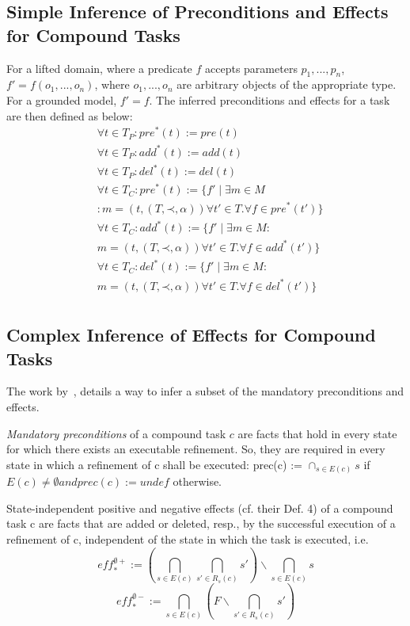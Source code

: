 \documentclass[letterpaper]{article} %
\newcommand{\Pre} {\ensuremath{\mathit{pre}}}  %
\newcommand{\Add} {\ensuremath{\mathit{add}}}
\newcommand{\Del} {\ensuremath{\mathit{del}}}
\newcommand{\PreS} {\ensuremath{\mathit{pre^{*}}}}
\newcommand{\AddS} {\ensuremath{\mathit{add^{*}}}}
\newcommand{\DelS} {\ensuremath{\mathit{del^{*}}}}
\newcommand{\singlePrec} {\ensuremath{\mathit{ \mathord{\prec} }}}
\newcommand{\RelEffPlus} {\ensuremath{\mathit{eff^{\emptyset +}_{*}}}}
\newcommand{\RelEffMinus} {\ensuremath{\mathit{eff^{\emptyset -}_{*}}}}
\begin{document}
 



\subsection{Simple Inference of Preconditions and Effects for Compound Tasks}
For a lifted domain, where a predicate $f$ accepts parameters $p_1, ..., p_n$, 
$f' = f(o_1, ..., o_n)$, where $o_1, ..., o_n$ are arbitrary objects of the appropriate type. For a grounded model, $f' = f$. The inferred preconditions and effects for a task are then defined as below:
\begin{align*}
& \forall t \in T_P : \PreS(t) := \Pre(t) \\
& \forall t \in T_P : \AddS(t) := \Add(t) \\
& \forall t \in T_P : \DelS(t) := \Del(t)  \\ %
& \forall t \in T_C : \PreS(t) := \{f'  \mid  \exists m \in M  \\
& : m=(t,(T, \singlePrec, \alpha)) \forall t' \in T.  \forall  f \in \PreS(t') \}   \\
& \forall t \in T_C : \AddS(t) := \{f'  \mid  \exists m \in M : \\
& m=(t,(T, \singlePrec, \alpha)) \forall t' \in T.  \forall  f \in \AddS(t') \}   \\
& \forall t \in T_C : \DelS(t) := \{f'  \mid  \exists m \in M : \\
& m=(t,(T, \singlePrec, \alpha)) \forall t' \in T.  \forall  f \in \DelS(t') \}   \\ 
\end{align*}


\subsection{Complex Inference of Effects for Compound Tasks}
The work by~\cite{ConnyPreEstimation}, details a way to infer a subset of the mandatory preconditions and effects. 

\emph{Mandatory preconditions} of a compound task $c$ are facts that hold in every state for which there exists an executable refinement. So, they are required in every state in which a refinement of c shall be executed: prec(c) := $\cap_{s \in E(c)}  s$
if $E(c) \neq \emptyset and prec(c) := undef$ otherwise.

State-independent positive and negative effects (cf. their
Def. 4) of a compound task c are facts that are added or
deleted, resp., by the successful execution of a refinement of
c, independent of the state in which the task is executed, i.e.
$$ \RelEffPlus := ( \bigcap_{s \in E(c)} \bigcap_{s' \in R_s(c)} s') \backslash  \bigcap_{s \in E(c)} s    $$
$$ \RelEffMinus := \bigcap_{s \in E(c)}  (F \backslash \bigcap_{s' \in R_s(c)} s' ) $$
\end{document}
